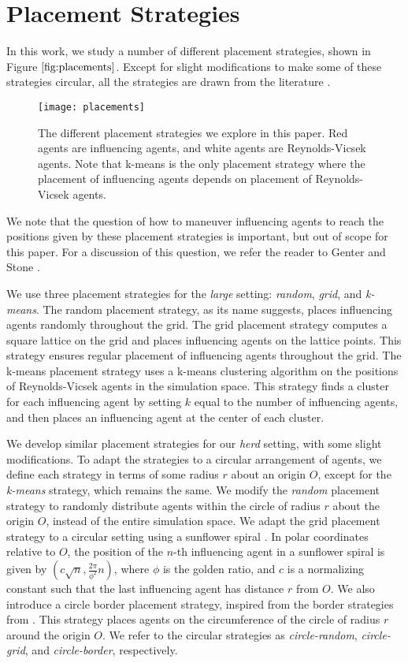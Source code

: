 \section{Placement Strategies}
In this work, we study a number of different placement strategies, shown in
Figure $\ref{fig:placements}$.
Except for slight modifications to make some of these strategies circular, all
the strategies are drawn from the literature \cite{genter2015placement,
genterthesis}.
\begin{figure}
    \centering
    \texttt{[image: placements]}
    \caption{The different placement strategies we explore in this paper.
    Red agents are influencing agents, and white agents are Reynolds-Vicsek
    agents.
    Note that k-means is the only placement strategy where the placement of
    influencing agents depends on placement of Reynolds-Vicsek agents.}
    \label{fig:placements}
\end{figure}
We note that the question of how to maneuver influencing agents to reach the
positions given by these placement strategies is important, but out of scope
for this paper.
For a discussion of this question, we refer the reader to Genter and Stone
\cite{genter2016facegoalfacecurrent, genterthesis}.

We use three placement strategies for the \textit{large} setting:
\textit{random}, \textit{grid}, and \textit{k-means}.
The random placement strategy, as its name suggests, places influencing agents
randomly throughout the grid.
The grid placement strategy computes a square lattice on the grid and places
influencing agents on the lattice points.
This strategy ensures regular placement of influencing agents throughout the
grid.
The k-means placement strategy uses a k-means clustering algorithm on the
positions of Reynolds-Vicsek agents in the simulation space.
This strategy finds a cluster for each influencing agent by setting $k$ equal
to the number of influencing agents, and then places an influencing agent at
the center of each cluster.

We develop similar placement strategies for our \textit{herd} setting, with
some slight modifications.
To adapt the strategies to a circular arrangement of agents, we define each
strategy in terms of some radius $r$ about an origin $O$, except for the
\textit{k-means} strategy, which remains the same.
We modify the \textit{random} placement strategy to randomly distribute agents
within the circle of radius $r$ about the origin $O$, instead of the entire
simulation space.
We adapt the grid placement strategy to a circular setting using a sunflower
spiral \cite{segermansunflower}.
In polar coordinates relative to $O$, the position of the $n$-th influencing
agent in a sunflower spiral is given by $(c\sqrt{n}, \frac{2\pi}{\phi^2}n)$,
where $\phi$ is the golden ratio, and $c$ is a normalizing constant such that
the last influencing agent has distance $r$ from $O$.
We also introduce a circle border placement strategy, inspired from the border
strategies from \cite{genter2015placement}.
This strategy places agents on the circumference of the circle of radius $r$
around the origin $O$.
We refer to the circular strategies as \textit{circle-random},
\textit{circle-grid}, and \textit{circle-border}, respectively.

